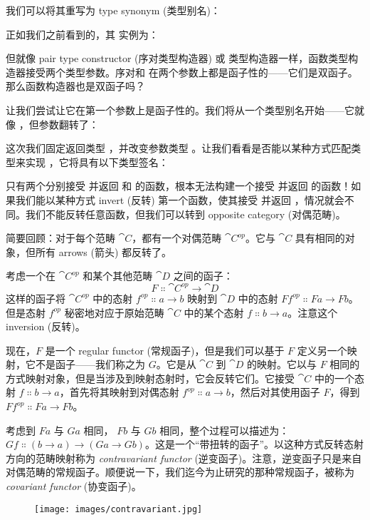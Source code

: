 我们可以将其重写为 type synonym (类型别名)：

正如我们之前看到的，其  实例为：

但就像 pair type constructor (序对类型构造器) 或  类型构造器一样，函数类型构造器接受两个类型参数。序对和  在两个参数上都是函子性的——它们是双函子。那么函数构造器也是双函子吗？

让我们尝试让它在第一个参数上是函子性的。我们将从一个类型别名开始——它就像 ，但参数翻转了：

这次我们固定返回类型 ，并改变参数类型 。让我们看看是否能以某种方式匹配类型来实现 ，它将具有以下类型签名：

只有两个分别接受  并返回  和  的函数，根本无法构建一个接受  并返回  的函数！如果我们能以某种方式 invert (反转) 第一个函数，使其接受  并返回 ，情况就会不同。我们不能反转任意函数，但我们可以转到 opposite category (对偶范畴)。

简要回顾：对于每个范畴 $\cat{C}$，都有一个对偶范畴 $\cat{C}^\mathit{op}$。它与 $\cat{C}$ 具有相同的对象，但所有 arrows (箭头) 都反转了。

考虑一个在 $\cat{C}^\mathit{op}$ 和某个其他范畴 $\cat{D}$ 之间的函子：
\[F \Colon \cat{C}^\mathit{op} \to \cat{D}\]
这样的函子将 $\cat{C}^\mathit{op}$ 中的态射 $f^\mathit{op} \Colon a \to b$ 映射到 $\cat{D}$ 中的态射 $F f^\mathit{op} \Colon F a \to F b$。但是态射 $f^\mathit{op}$ 秘密地对应于原始范畴 $\cat{C}$ 中的某个态射 $f \Colon b \to a$。注意这个 inversion (反转)。

现在，$F$ 是一个 regular functor (常规函子)，但是我们可以基于 $F$ 定义另一个映射，它不是函子——我们称之为 $G$。它是从 $\cat{C}$ 到 $\cat{D}$ 的映射。它以与 $F$ 相同的方式映射对象，但是当涉及到映射态射时，它会反转它们。它接受 $\cat{C}$ 中的一个态射 $f \Colon b \to a$，首先将其映射到对偶态射 $f^\mathit{op} \Colon a \to b$，然后对其使用函子 $F$，得到 $F f^\mathit{op} \Colon F a \to F b$。

考虑到 $F a$ 与 $G a$ 相同， $F b$ 与 $G b$ 相同，整个过程可以描述为：$G f \Colon (b \to a) \to (G a \to G b)$。这是一个“带扭转的函子”。以这种方式反转态射方向的范畴映射称为 \emph{contravariant functor} (逆变函子)。注意，逆变函子只是来自对偶范畴的常规函子。顺便说一下，我们迄今为止研究的那种常规函子，被称为 \emph{covariant functor} (协变函子)。

\begin{figure}[H]
  \centering
  \texttt{[image: images/contravariant.jpg]}
\end{figure}

